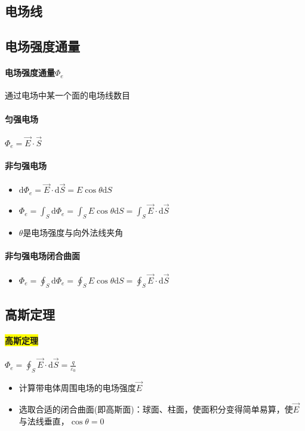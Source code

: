 \documentclass[UTF8,a4paper,12pt,scheme=chinese]{ctexbook}
\newcommand{\sll}[1]{\overrightarrow{#1}}
\newcommand{\ud}{\mathrm{d}}
\newcommand{\hl}[1]{\colorbox{yellow}{#1}}
\begin{document}
	\subsection{电场线}
	\subsection{电场强度通量}
	\paragraph{电场强度通量$ \varPhi_e $}通过电场中某一个面的电场线数目
	\paragraph{匀强电场}$ \varPhi_e=\sll{E}\cdot\sll{S} $
	\paragraph{非匀强电场}
	\begin{itemize}
		\item $ \ud\varPhi_e=\sll{E}\cdot\ud\sll{S}=E\cos\theta\ud S $
		\item $ \varPhi_e=\int_S\ud\varPhi_e=\int_SE\cos\theta\ud S=\int_S\sll{E}\cdot\ud\sll{S} $
		\item $ \theta $是电场强度与向外法线夹角
	\end{itemize}
	\paragraph{非匀强电场闭合曲面}
	\begin{itemize}
		\item $ \varPhi_e=\oint_S\ud\varPhi_e=\oint_SE\cos\theta\ud S=\oint_S\sll{E}\cdot\ud\sll{S} $
	\end{itemize}
	\subsection{高斯定理}
	\paragraph{\hl{高斯定理}}$ \varPhi_e=\oint_S\sll{E}\cdot\ud\sll{S}=\frac{q}{\varepsilon_0} $
	\begin{itemize}
		\item 计算带电体周围电场的电场强度$ \sll{E} $
		\item 选取合适的闭合曲面(即高斯面)：球面、柱面，使面积分变得简单易算，使$ \sll{E} $与法线垂直，$ \cos\theta=0 $
	\end{itemize}
\end{document}
